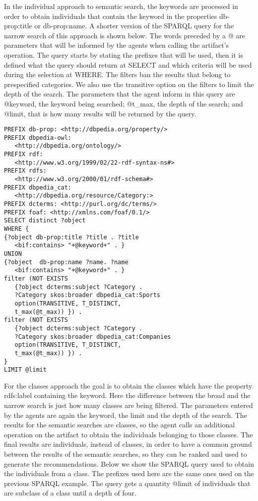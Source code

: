 \documentclass[a4paper,twoside]{article}
\begin{document}
In the individual approach to semantic search, the keywords are processed in order to obtain individuals that contain the keyword in the properties db-prop:title or db-prop:name. A shorter version of the SPARQL query for the narrow search of this approach is shown below. The words preceded by a @ are parameters that will be informed by the agents when calling the artifact's operation. The query starts by stating the prefixes that will be used, then it is defined what the query should return at SELECT and which criteria will be used during the selection at WHERE. The filters ban the results that belong to prespecified categories. We also use the transitive option on the filters to limit the depth of the search. The parameters that the agent inform in this query are @keyword, the keyword being searched; @t\_max, the depth of the search; and @limit, that is how many results will be returned by the query.

\begin{small}
\begin{verbatim}
PREFIX db-prop: <http://dbpedia.org/property/>
PREFIX dbpedia-owl:
   <http://dbpedia.org/ontology/>
PREFIX rdf:
   <http://www.w3.org/1999/02/22-rdf-syntax-ns#>
PREFIX rdfs:
   <http://www.w3.org/2000/01/rdf-schema#>
PREFIX dbpedia_cat:
   <http://dbpedia.org/resource/Category:>
PREFIX dcterms: <http://purl.org/dc/terms/>
PREFIX foaf: <http://xmlns.com/foaf/0.1/>
SELECT distinct ?object
WHERE {
{?object db-prop:title ?title . ?title
   <bif:contains> "+@keyword+" . }
UNION 
{?object  db-prop:name ?name. ?name
   <bif:contains> "+@keyword+" . }
filter (NOT EXISTS
   {?object dcterms:subject ?Category .
   ?Category skos:broader dbpedia_cat:Sports
   option(TRANSITIVE, T_DISTINCT,
   t_max(@t_max)) }) .
filter (NOT EXISTS
   {?object dcterms:subject ?Category .
   ?Category skos:broader dbpedia_cat:Companies
   option(TRANSITIVE, T_DISTINCT,
   t_max(@t_max)) }) .
}
LIMIT @limit
\end{verbatim}
\end{small}

For the classes approach the goal is to obtain the classes which have the property rdfs:label containing the keyword. Here the difference between the broad and the narrow search is just how many classes are being filtered. The parameters entered by the agents are again the keyword, the limit and the depth of the search. The results for the semantic searches are classes, so the agent calls an additional operation on the artifact to obtain the individuals belonging to those classes. The final results are individuals, instead of classes, in order to have a common ground between the results of the semantic searches, so they can be ranked and used to generate the recommendations. Below we show the SPARQL query used to obtain the individuals from a class. The prefixes used here are the same ones used on the previous SPARQL example. The query gets a quantity @limit of individuals that are subclass of a class until a depth of four.
\end{document}
